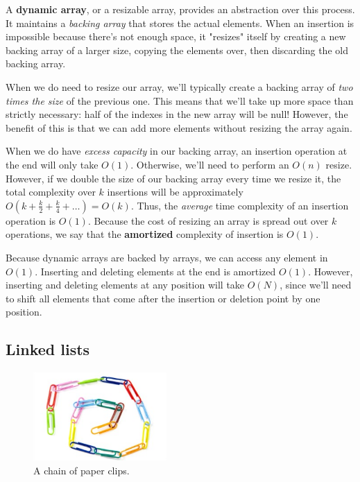 A \textbf{dynamic array}, or a resizable array, provides an abstraction over this process. It maintains a \textit{backing array} that stores the actual elements. When an insertion is impossible because there's not enough space, it "resizes" itself by creating a new backing array of a larger size, copying the elements over, then discarding the old backing array.

When we do need to resize our array, we'll typically create a backing array of \textit{two times the size} of the previous one. This means that we'll take up more space than strictly necessary: half of the indexes in the new array will be null! However, the benefit of this is that we can add more elements without resizing the array again.

When we do have \textit{excess capacity} in our backing array, an insertion operation at the end will only take $O(1)$. Otherwise, we'll need to perform an $O(n)$ resize. However, if we double the size of our backing array every time we resize it, the total complexity over $k$ insertions will be approximately $O(k + \frac{k}{2} + \frac{k}{4} + \dots) = O(k)$. Thus, the \textit{average} time complexity of an insertion operation is $O(1)$. Because the cost of resizing an array is spread out over $k$ operations, we say that the \textbf{amortized} complexity of insertion is $O(1)$.

Because dynamic arrays are backed by arrays, we can access any element in $O(1)$. Inserting and deleting elements at the end is amortized $O(1)$. However, inserting and deleting elements at any position will take $O(N)$, since we'll need to shift all elements that come after the insertion or deletion point by one position.


\subsection{Linked lists}

\begin{figure}[h]
\begin{center}
\includegraphics[width=2in]{images/paper_clip_chain.jpg}
\end{center}
\caption{A chain of paper clips.}
\label{fig:paper-clips}
\end{figure}

